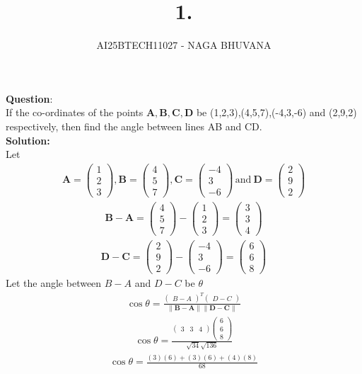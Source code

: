 \documentclass{beamer}
\title{1.}
\author{AI25BTECH11027 - NAGA BHUVANA}
\theoremstyle{remark}
\newcommand{\myvec}[1]{\ensuremath{\begin{pmatrix}#1\end{pmatrix}}}
\let\vec\mathbf
\numberwithin{equation}{section}
\begin{document}
{\let\newpage\relax\maketitle}
\renewcommand{\thefigure}{\theenumi}
\renewcommand{\thetable}{\theenumi}
   \noindent
		\textbf{Question}:\\
        If the co-ordinates of the points $\vec{A},\vec{B},\vec{C},\vec{D}$ be (1,2,3),(4,5,7),(-4,3,-6) and (2,9,2) respectively, then find the angle between lines AB and CD.\\
\textbf{Solution:}\\
Let 
\begin{align}
    \vec{A}=\myvec{1\\2\\3},\vec{B}=\myvec{4\\5\\7},\vec{C}=\myvec{-4\\3\\-6} \, \text{and} \:  \vec{D}=\myvec{2\\9\\2}
\end{align}
\begin{align}
    \vec{B-A}=\myvec{4\\5\\7}-\myvec{1\\2\\3}=\myvec{3\\3\\4}
\end{align}	
\begin{align}
    \vec{D-C}=\myvec{2\\9\\2}-\myvec{-4\\3\\-6}=\myvec{6\\6\\8}
\end{align}
Let the angle between $B-A$ and $D-C$ be $\theta$
\begin{align}
    \cos{\theta}=\frac{\myvec{B-A}^T \myvec{D-C}}{\|\vec{B-A}\| \|\vec{D-C}\|}
\end{align}
\begin{align}
    \cos{\theta}=\frac{\myvec{3 & 3 & 4}\myvec{6\\6\\8}}{\sqrt{34}\sqrt{136}}
\end{align}
\begin{align}
    \cos{\theta}=\frac{(3)(6)+(3)(6)+(4)(8)}{68}
\end{align}
\end{document}
